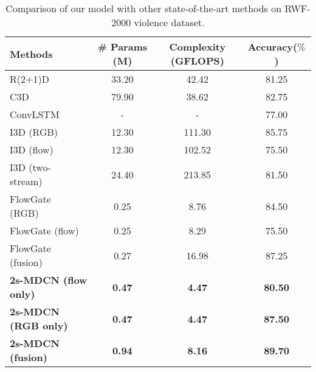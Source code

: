 \begin{table*}[htb]
    \begin{center}
		\begin{tabular}{lccc}
			\hline
			Methods	                     &\# Params (M)              & Complexity (GFLOPS)                & Accuracy($\%$)		\\
			\hline
            R(2+1)D~\cite{r21dtran2018closer}          					& 33.20 									& 42.42 							  						& 81.25								\\
			C3D~\cite{c3dtran2015learning} 									& 79.90 									& 38.62							   						& 82.75								\\
			ConvLSTM~\cite{29_sudhakaran2017learning} 						& -                                      	& -															& 77.00					\\
			I3D (RGB)~\cite{i3dcarreira2017quo}							& 12.30										& 111.30 													&	85.75						\\
           I3D 	(flow)~\cite{i3dcarreira2017quo}								& 12.30										& 102.52 												&	75.50						\\
           I3D (two-stream)~\cite{i3dcarreira2017quo}	 				& 24.40									& 213.85 												&	81.50						\\
           FlowGate (RGB)~\cite{cheng2019rwf}				& 0.25									& 8.76													& 84.50								\\
           FlowGate (flow)~\cite{cheng2019rwf}				& 0.25									& 8.29													&	75.50							\\
           FlowGate (fusion)~\cite{cheng2019rwf}			 	& 0.27										& 16.98													& 87.25								\\
            \hline
			\textbf{2s-MDCN (flow only)}					& \textbf{0.47}						& \textbf{4.47}								 		& \textbf{80.50}							\\
			\textbf{2s-MDCN (RGB only)}						& \textbf{0.47}						& \textbf{4.47}								 		& \textbf{87.50}							\\
			\textbf{2s-MDCN (fusion)}						& \textbf{0.94}						& \textbf{8.16}								 		& \textbf{89.70}							\\
			\hline
		\end{tabular}		
    \end{center}
	\caption{Comparison of our model with other state-of-the-art methods on RWF-2000 violence dataset.}
    \label{tab:rwf-2000}
	\end{table*}